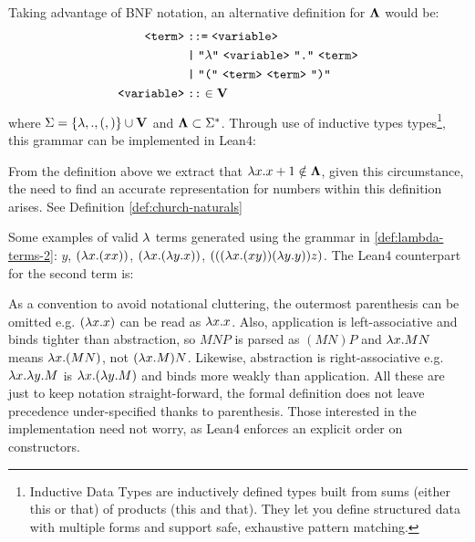 \begin{definition} Taking advantage of BNF notation, an alternative definition for $\mathbf{\Lambda}$ would be:
  \label{def:lambda-terms-2}
  \begin{align*}
    \texttt{<term>} &\;\texttt{::=}\; \texttt{<variable>} \\
                    &\;\texttt{|}\; \texttt{"$\la$"}\ \texttt{<variable>}\ \texttt{"."}\ \texttt{<term>} \\
                    &\;\texttt{|}\; \texttt{"("}\ \texttt{<term>}\ \texttt{<term>}\ \texttt{")"} \\
    \texttt{<variable>} &\;\texttt{::}\in \Vset
  \end{align*}
  where \( \Sigma = \{ \lambda, ., (, )\} \cup \mathbf{V} \) and \( \mathbf{\Lambda} \subset \Sigma^* \). Through use of inductive types types\footnote{Inductive Data Types are inductively defined types built from sums (either this or that) of products (this and that). They let you define structured data with multiple forms and support safe, exhaustive pattern matching.}, this grammar can be implemented in Lean4:

\end{definition}
\begin{remark}
  From the definition above we extract that \( \lambda x . x + 1 \notin \mathbf{\Lambda} \), given this circumstance, the need to find an accurate representation for numbers within this definition arises. See Definition \ref{def:church-naturals}
\end{remark}
\begin{example} \label{ex:lambda-terms} Some examples of valid $\lambda$ terms generated using the grammar in \ref{def:lambda-terms-2}:
  \( y \),
  \( (\lambda x. (x x)) \),
  \( (\lambda x. (\lambda y. x)) \),
  \( (((\lambda x. (x y)) (\lambda y. y)) z) \).
  The Lean4 counterpart for the second term is:
\end{example}
As a convention to avoid notational cluttering, the outermost parenthesis can be omitted e.g. $ ( \lambda x.x ) $ can be read as $ \lambda x.x $. Also, application is left-associative  and binds tighter than abstraction, so $M N P$ is parsed as $(M N) P$ and $\lambda x . M N$ means $\lambda x . (M N)$, not $(\lambda x . M) N$. Likewise, abstraction is right-associative e.g. $\lambda x . \lambda y . M$ is $\lambda x . (\lambda y . M)$ and binds more weakly than application. All these are just to keep notation straight-forward, the formal definition does not leave precedence under-specified thanks to parenthesis. Those interested in the implementation need not worry, as Lean4 enforces an explicit order on constructors.
